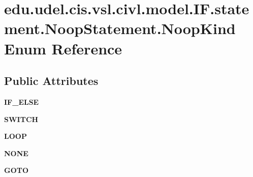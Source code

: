 \hypertarget{enumedu_1_1udel_1_1cis_1_1vsl_1_1civl_1_1model_1_1IF_1_1statement_1_1NoopStatement_1_1NoopKind}{}\section{edu.\+udel.\+cis.\+vsl.\+civl.\+model.\+I\+F.\+statement.\+Noop\+Statement.\+Noop\+Kind Enum Reference}
\label{enumedu_1_1udel_1_1cis_1_1vsl_1_1civl_1_1model_1_1IF_1_1statement_1_1NoopStatement_1_1NoopKind}
\subsection*{Public Attributes}
\begin{DoxyCompactItemize}
\item 
\hypertarget{enumedu_1_1udel_1_1cis_1_1vsl_1_1civl_1_1model_1_1IF_1_1statement_1_1NoopStatement_1_1NoopKind_a4bb8aa30ad63680ff75520024222aacf}{}{\bfseries I\+F\+\_\+\+E\+L\+S\+E}\label{enumedu_1_1udel_1_1cis_1_1vsl_1_1civl_1_1model_1_1IF_1_1statement_1_1NoopStatement_1_1NoopKind_a4bb8aa30ad63680ff75520024222aacf}

\item 
\hypertarget{enumedu_1_1udel_1_1cis_1_1vsl_1_1civl_1_1model_1_1IF_1_1statement_1_1NoopStatement_1_1NoopKind_a7e43fd869932f360d37671d1cbcf2dfd}{}{\bfseries S\+W\+I\+T\+C\+H}\label{enumedu_1_1udel_1_1cis_1_1vsl_1_1civl_1_1model_1_1IF_1_1statement_1_1NoopStatement_1_1NoopKind_a7e43fd869932f360d37671d1cbcf2dfd}

\item 
\hypertarget{enumedu_1_1udel_1_1cis_1_1vsl_1_1civl_1_1model_1_1IF_1_1statement_1_1NoopStatement_1_1NoopKind_af60d1232964368e979fde04a948caefc}{}{\bfseries L\+O\+O\+P}\label{enumedu_1_1udel_1_1cis_1_1vsl_1_1civl_1_1model_1_1IF_1_1statement_1_1NoopStatement_1_1NoopKind_af60d1232964368e979fde04a948caefc}

\item 
\hypertarget{enumedu_1_1udel_1_1cis_1_1vsl_1_1civl_1_1model_1_1IF_1_1statement_1_1NoopStatement_1_1NoopKind_a05ab19f4a4a50c789a5b5abfc034b043}{}{\bfseries N\+O\+N\+E}\label{enumedu_1_1udel_1_1cis_1_1vsl_1_1civl_1_1model_1_1IF_1_1statement_1_1NoopStatement_1_1NoopKind_a05ab19f4a4a50c789a5b5abfc034b043}

\item 
\hypertarget{enumedu_1_1udel_1_1cis_1_1vsl_1_1civl_1_1model_1_1IF_1_1statement_1_1NoopStatement_1_1NoopKind_a4a8e5db2bf7d79e8d8d569588d7511f2}{}{\bfseries G\+O\+T\+O}\label{enumedu_1_1udel_1_1cis_1_1vsl_1_1civl_1_1model_1_1IF_1_1statement_1_1NoopStatement_1_1NoopKind_a4a8e5db2bf7d79e8d8d569588d7511f2}


\end{DoxyCompactItemize}
